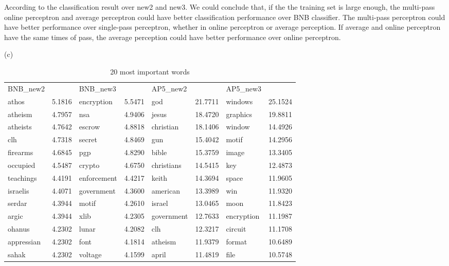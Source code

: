 \documentclass[twoside,11pt]{homework}
\begin{document}
According to the classification result over new2 and new3. 
We could conclude that, if the the training set is large enough, the multi-pass online perceptron and average perceptron could have better classification performance over BNB classifier. 
The multi-pass perceptron could have better performance over single-pass perceptron, whether in online perceptron or average perception.  If average and online perceptron have the same times of pass, the average perception could have better performance over online perceptron. 


(c)\\
\begin{table}[h]
\caption {20 most important words} \label{tab:title}
\begin{tabular}{llllllll}

BNB\_new2    &  & BNB\_new3  &    & AP5\_new2        &  & AP5\_new3  &  \\
athos      & 5.1816 & encryption  & 5.5471 & god        & 21.7711 & windows    & 25.1524 \\
atheism    & 4.7957 & nsa         & 4.9406 & jesus      & 18.4720 & graphics   & 19.8811 \\
atheists   & 4.7642 & escrow      & 4.8818 & christian  & 18.1406 & window     & 14.4926 \\
clh        & 4.7318 & secret      & 4.8469 & gun        & 15.4042 & motif      & 14.2956 \\
firearms   & 4.6845 & pgp         & 4.8290 & bible      & 15.3759 & image      & 13.3405 \\
occupied   & 4.5487 & crypto      & 4.6750 & christians & 14.5415 & key        & 12.4873 \\
teachings  & 4.4191 & enforcement & 4.4217 & keith      & 14.3694 & space      & 11.9605 \\
israelis   & 4.4071 & government  & 4.3600 & american   & 13.3989 & win        & 11.9320 \\
serdar     & 4.3944 & motif       & 4.2610 & israel     & 13.0465 & moon       & 11.8423 \\
argic      & 4.3944 & xlib        & 4.2305 & government & 12.7633 & encryption & 11.1987 \\
ohanus     & 4.2302 & lunar       & 4.2082 & clh        & 12.3217 & circuit    & 11.1708 \\
appressian & 4.2302 & font        & 4.1814 & atheism    & 11.9379 & format     & 10.6489 \\
sahak      & 4.2302 & voltage     & 4.1599 & april      & 11.4819 & file       & 10.5748 \\

\end{tabular}
\end{table}
\end{document}
